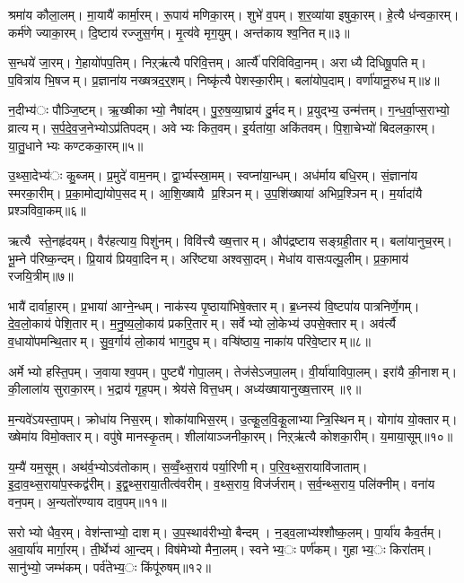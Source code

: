 श्रमा॑य कौला॒लम्। मा॒यायै॑ कार्मा॒रम्। रू॒पाय॑ मणिका॒रम्। शुभे॑ व॒पम्। श॒र॒व्या॑या इषुका॒रम्। हे॒त्यै ध॑न्वका॒रम्। कर्म॑णे ज्याका॒रम्। दि॒ष्टाय॑ रज्जुस॒र्गम्। मृ॒त्य॑वे मृग॒युम्। अन्त॑काय श्व॒नितम्॥३॥

स॒न्धये॑ जा॒रम्। गे॒हायो॑पप॒तिम्। निऱ्ऋ॑त्यै परिवि॒त्तम्। आर्त्यै॑ परिविविदा॒नम्। अराध्यै दिधिषू॒पतिम्। प॒वित्रा॑य भि॒षजम्। प्र॒ज्ञाना॑य नख्षत्रद॒र्॒शम्। निष्कृ॑त्यै पेशस्का॒रीम्। बला॑योप॒दाम्। वर्णा॑यानू॒रुधम्॥४॥

न॒दीभ्य॑ः पौञ्जि॒ष्टम्। ऋ॒ख्षीकाभ्यो॒ नैषा॑दम्। पु॒रु॒ष॒व्या॒घ्राय॑ दु॒र्मदम्। प्र॒युद्भ्य॒ उन्म॑त्तम्। ग॒न्ध॒र्वा॒प्स॒राभ्यो॒ व्रात्यम्। स॒र्प॒दे॒व॒ज॒नेभ्योऽप्र॑तिपदम्। अवेभ्यः कित॒वम्। इ॒र्यता॑या॒ अकि॑तवम्। पि॒शा॒चेभ्यो॑ बिदलका॒रम्। या॒तु॒धानेभ्यः कण्टकका॒रम्॥५॥

उ॒थ्सा॒देभ्य॑ः कु॒ब्जम्। प्र॒मुदे॑ वाम॒नम्। द्वा॒र्भ्यस्स्रा॒मम्। स्वप्ना॑या॒न्धम्। अध॑र्माय बधि॒रम्। सं॒ज्ञाना॑य स्मरका॒रीम्। प्र॒का॒मोद्या॑योप॒सदम्। आ॒शि॒ख्षायै प्र॒श्ञिनम्। उ॒प॒शि॑ख्षाया॑ अभिप्र॒श्ञिनम्। म॒र्यादा॑यै प्रश्ञविवा॒कम्॥६॥

ऋत्यै स्ते॒नहृ॑दयम्। वैर॑हत्याय॒ पिशु॑नम्। विवि॑त्त्यै ख्ष॒त्तारम्। औप॑द्रष्टाय सङ्ग्रही॒तारम्। बला॑यानुच॒रम्। भू॒म्ने प॑रिष्क॒न्दम्। प्रि॒याय॑ प्रियवा॒दिनम्। अरि॑ष्ट्या अश्वसा॒दम्। मेधा॑य वासःपल्पू॒लीम्। प्र॒का॒माय॑ रजयि॒त्रीम्॥७॥

भायै॑ दार्वाहा॒रम्। प्र॒भाया॑ आग्ने॒न्धम्। नाक॑स्य पृ॒ष्ठाया॑भिषे॒क्तारम्। ब्र॒ध्नस्य॑ वि॒ष्टपा॑य पात्रनिर्णे॒गम्। दे॒व॒लो॒काय॑ पेशि॒तारम्। म॒नु॒ष्य॒लो॒काय॑ प्रकरि॒तारम्। सर्वेभ्यो लो॒केभ्य॑ उपसे॒क्तारम्। अव॑र्त्यै व॒धायो॑पमन्थि॒तारम्। सु॒व॒र्गाय॑ लो॒काय॑ भाग॒दुघम्। वऱ्षि॑ष्ठाय॒ नाका॑य परिवे॒ष्टारम्॥८॥

अर्मेभ्यो हस्ति॒पम्। ज॒वायाश्व॒पम्। पुष्ट्यै॑ गोपा॒लम्। तेज॑सेऽजपा॒लम्। वी॒र्या॑याविपा॒लम्। इरा॑यै की॒नाशम्। की॒लाला॑य सुराका॒रम्। भ॒द्राय॑ गृह॒पम्। श्रेय॑से वित्त॒धम्। अध्य॑ख्षायानुख्ष॒त्तारम्॥९॥

म॒न्यवे॑ऽयस्ता॒पम्। क्रोधा॑य निस॒रम्। शोका॑याभिस॒रम्। उ॒त्कू॒ल॒वि॒कू॒लाभ्यान्त्रि॒स्थिनम्। योगा॑य यो॒क्तारम्। ख्षेमा॑य विमो॒क्तारम्। वपु॑षे मानस्कृ॒तम्। शीला॑याञ्जनीका॒रम्। निऱ्ऋ॑त्यै कोशका॒रीम्। य॒माया॒सूम्॥१०॥

य॒म्यै॑ यम॒सूम्। अथ॑र्व॒भ्योऽव॑तोकाम्। स॒व्वँ॒थ्स॒राय॑ पर्या॒रिणीम्। प॒रि॒व॒थ्स॒रायावि॑जाताम्। इ॒दा॒व॒थ्स॒राया॑प॒स्कद्व॑रीम्। इ॒द्व॒थ्स॒राया॒तीत्व॑वरीम्। व॒थ्स॒राय॒ विज॑र्जराम्। स॒र्व॒न्थ्स॒राय॒ पलि॑क्नीम्। वना॑य वन॒पम्। अ॒न्यतो॑रण्याय दाव॒पम्॥११॥

सरोभ्यो धैव॒रम्। वेश॑न्ताभ्यो॒ दाशम्। उ॒प॒स्थाव॑रीभ्यो॒ बैन्दम्। न॒ड्व॒लाभ्य॑श्शौष्क॒लम्। पा॒र्या॑य कैव॒र्तम्। अ॒वा॒र्या॑य मार्गा॒रम्। ती॒र्थेभ्य॑ आ॒न्दम्। विष॑मेभ्यो मैना॒लम्। स्वनेभ्य॒ः पर्ण॑कम्। गुहाभ्य॒ः किरा॑तम्। सानु॑भ्यो॒ जम्भ॑कम्। पर्व॑तेभ्य॒ः किंपू॑रुषम्॥१२॥

